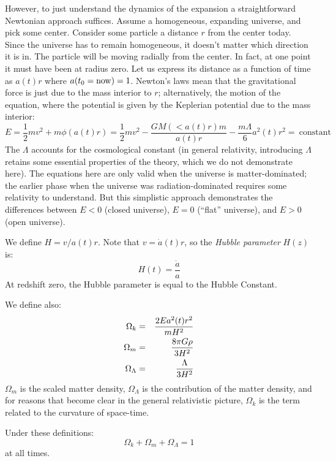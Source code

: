 However, to just understand the dynamics of the expansion a
straightforward Newtonian approach suffices.  Assume a homogeneous,
expanding universe, and pick some center.  Consider some particle a
distance $r$ from the center today. Since the universe has to remain
homogeneous, it doesn't matter which direction it is in.  The particle
will be moving radially from the center. In fact, at one point it must
have been at radius zero. Let us express its distance as a function of
time as $a(t)r$ where $a(t_0 = {\rm now}) = 1$. Newton's laws mean
that the gravitational force is just due to the mass interior to $r$;
alternatively, the motion of the %
equation, where the potential is given by the Keplerian potential due
to the mass interior:
\begin{equation}
\label{eq:energy}
E = \frac{1}{2} m v^2 + m \phi(a(t) r) = \frac{1}{2} m v^2 -
\frac{GM(<a(t) r)m}{a(t) r} - \frac{m\Lambda}{6} a^2(t) r^2 =
\mathrm{~constant}
\end{equation}
The $\Lambda$ accounts for the cosmological constant (in general
relativity, introducing $\Lambda$ retains some essential properties of
the theory, which we do not demonstrate here). The equations here are
only valid when the universe is matter-dominated; the earlier phase
when the universe was radiation-dominated requires some relativity to
understand. But this simplistic approach demonstrates the differences
between $E<0$ (closed universe), $E=0$ (``flat'' universe), and $E>0$
(open universe).

We define $H=v/a(t)r$. Note that $v={\dot a}(t) r$, so the {\it Hubble
  parameter} $H(z)$ is:
\begin{equation}
  H(t) = \frac{\dot a}{a}
\end{equation}
At redshift zero, the Hubble parameter is equal to the Hubble
Constant.

We define also:
\begin{eqnarray}
\Omega_k &=& \frac{2Ea^2(t) r^2}{mH^2} \cr
\Omega_m &=& \frac{8\pi G\rho}{3H^2}\cr
\Omega_\Lambda &=& \frac{\Lambda}{3H^2} 
\end{eqnarray}
$\Omega_m$ is the scaled matter density, $\Omega_\Lambda$ is the
contribution of the matter density, and for reasons that become clear
in the general relativistic picture, $\Omega_k$ is the term related to
the curvature of space-time.

Under these definitions:
\begin{equation}
\Omega_k + \Omega_m + \Omega_\Lambda = 1
\end{equation}
at all times.

